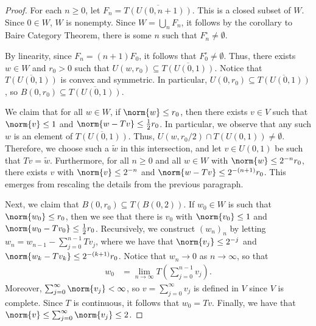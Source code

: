 \documentclass[10pt]{mypackage}
\begin{document}
\begin{proof}
  For each $n\geq 0$, let $F_n = \overline{T\left( U\left( 0,n+1 \right) \right)}$. This is a closed subset of $W$. Since $0\in W$, $W$ is nonempty. Since $W = \bigcup_{n}F_n$, it follows by the corollary to Baire Category Theorem, there is some $n$ such that $F_n^{\circ}\neq \emptyset$.

  By linearity, since $F_n = \left( n +1 \right)F_0$, it follows that $F_0^{\circ}\neq\emptyset$. Thus, there exists $w\in W$ and $r_0 > 0$ such that $U\left( w,r_0 \right)\subseteq \overline{T\left( U\left( 0,1 \right) \right)}$. Notice that $ \overline{T\left( U\left( 0,1 \right) \right)} $ is convex and symmetric. In particular, $U\left( 0,r_0 \right)\subseteq \overline{T\left( U\left( 0,1 \right) \right)}$, so $ B\left( 0,r_0 \right)\subseteq \overline{T\left( U\left( 0,1 \right) \right)} $.

  We claim that for all $w\in W$, if $\norm{w}\leq r_0$, then there exists $v\in V$ such that $\norm{v}\leq 1$ and $\norm{w-Tv} \leq \frac{1}{2}r_0$. In particular, we observe that any such $w$ is an element of $ \overline{T\left( U\left( 0,1 \right) \right)} $. Thus, $U\left( w,r_0/2 \right)\cap T\left( U\left( 0,1 \right) \right)\neq \emptyset$. Therefore, we choose such a $ \widetilde{w} $ in this intersection, and let $ v\in U\left( 0,1 \right) $ be such that $Tv = \widetilde{w}$. Furthermore, for all $n\geq 0$ and all $w\in W$ with $\norm{w}\leq 2^{-n}r_0$, there exists $v$ with $\norm{v}\leq 2^{-n}$ and $\norm{w-Tv}\leq 2^{-\left( n+1 \right)}r_0$. This emerges from rescaling the details from the previous paragraph.

  Next, we claim that $ B\left( 0,r_0 \right)\subseteq T\left( B\left( 0,2 \right) \right) $. If $w_0\in W$ is such that $\norm{w_0}\leq r_0$, then we see that there is $v_0$ with $\norm{v_0}\leq 1$ and $\norm{w_0-Tv_0}\leq \frac{1}{2}r_0$. Recursively, we construct $\left( w_n \right)_n$ by letting $w_n = w_{n-1} - \sum_{j=0}^{n-1}Tv_j$, where we have that $\norm{v_j}\leq 2^{-j}$ and $\norm{w_{k} - Tv_k}\leq 2^{-(k+1)}r_0$. Notice that $w_n\to0$ as $n\to\infty$, so that
  \begin{align*}
    w_0 &= \lim_{n\to\infty} T\left( \sum_{j=0}^{n-1}v_j \right).
  \end{align*}
  Moreover, $\sum_{j=0}^{\infty}\norm{v_j} < \infty$, so $v = \sum_{j=0}^{\infty}v_j$ is defined in $V$ since $V$ is complete. Since $T$ is continuous, it follows that $w_0 = Tv$. Finally, we have that $\norm{v}\leq \sum_{j=0}^{\infty}\norm{v_j} \leq 2$.


\end{proof}
\end{document}
